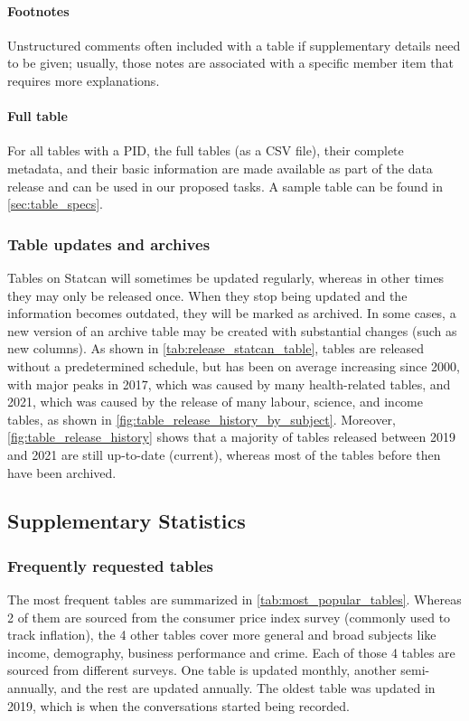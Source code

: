 \documentclass[11pt]{article}
\begin{document}
\paragraph{Footnotes} Unstructured comments often included with a table if supplementary details need to be given; usually, those notes are associated with a specific member item that requires more explanations.

\paragraph{Full table} For all tables with a PID, the full tables (as a CSV file), their complete metadata, and their basic information are made available as part of the data release and can be used in our proposed tasks. A sample table can be found in \autoref{sec:table_specs}.

\subsubsection{Table updates and archives}
\label{sec:appendix_table_updates}

Tables on Statcan will sometimes be updated regularly, whereas in other times they may only be released once. When they stop being updated and the information becomes outdated, they will be marked as archived. In some cases, a new version of an archive table may be created with substantial changes (such as new columns). As shown in \autoref{tab:release_statcan_table}, tables are released without a predetermined schedule, but has been on average increasing since 2000, with major peaks in 2017, which was caused by many health-related tables, and 2021, which was caused by the release of many labour, science, and income tables, as shown in \autoref{fig:table_release_history_by_subject}. Moreover,  \autoref{fig:table_release_history} shows that a majority of tables released between 2019 and 2021 are still up-to-date (current), whereas most of the tables before then have been archived.


\subsection{Supplementary Statistics}
\label{sec:appendix_supplementary_stats}

\subsubsection{Frequently requested tables}
\label{sec:appendix_frequently_requested_tables}
The most frequent tables are summarized in \autoref{tab:most_popular_tables}. Whereas 2 of them are sourced from the consumer price index survey (commonly used to track inflation), the 4 other tables cover more general and broad subjects like income, demography, business performance and crime. Each of those 4 tables are sourced from different surveys. One table is updated monthly, another semi-annually, and the rest are updated annually. The oldest table was updated in 2019, which is when the conversations started being recorded. 
\end{document}
